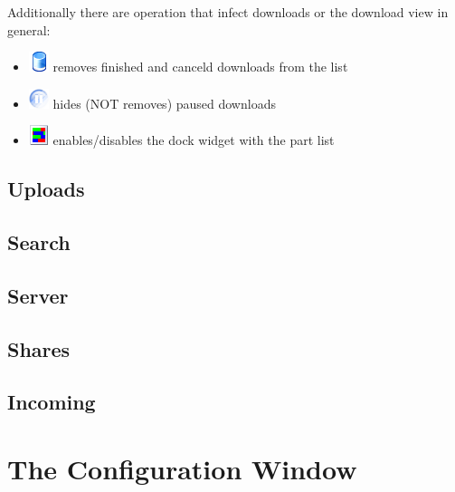 \documentclass[a4paper,10pt]{book}
\begin{document}
Additionally there are operation that infect downloads or the download view in general:
\begin{itemize}
 \item \includegraphics[width=22px]{../emptytrash.png} removes finished and canceld downloads from the list
 \item \includegraphics[width=22px]{../pause_fade.png} hides (NOT removes) paused downloads
 \item \includegraphics[width=22px]{../partlist2.png} enables/disables the dock widget with the part list
\end{itemize}

\section{Uploads}
\label{sec:uploads}

\section{Search}
\label{sec:search}

\section{Server}
\label{sec:server}

\section{Shares}
\label{sec:shares}

\section{Incoming}
\label{sec:incoming}


\chapter{The Configuration Window}
\label{sec:configuration}
\end{document}
